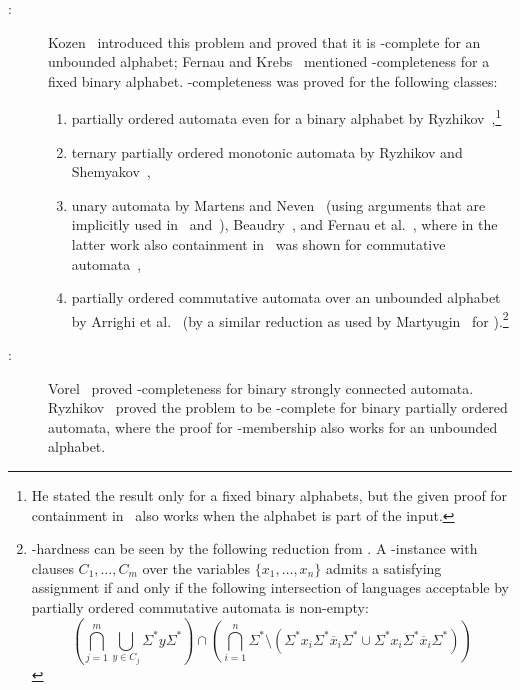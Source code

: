 \begin{description}
	\item[\DFAINT:] \label{prelim:classes:intro:INT}  Kozen~\cite[p.~261]{Kozen77} introduced this problem and proved 
	that it is \PSPACE-complete for an unbounded alphabet;  Fernau and Krebs~\cite[p.~2]{FerKre2017} mentioned \PSPACE-\-com\-plete\-ness for a fixed binary alphabet.		
	\NP-completeness was proved for the following classes: 
	\begin{enumerate}
	\item  partially ordered automata
	even for a binary alphabet by Ryzhikov~\cite[Prop.~9]{Ryzhikov19a},\footnote{He stated the result only for a fixed binary alphabets, but the given proof for containment in \NP\  also works when the alphabet
		is part of the input.}
	
	\item ternary partially ordered monotonic automata by Ryzhikov and Shemyakov~\cite[Thm.~4.1]{RyzhikovS18},
	
	\item unary automata by Martens and Neven~\cite[Lem.~27]{MartensN07} (using arguments that are implicitly
	used in~\cite[Thm.~2]{Galil76} and~\cite[Thm.~6.1]{Stockmeyer73}),
	Beaudry~\cite{Beaudry88thesis}, and Fernau et al.~\cite[Thm.~4.1]{DBLP:journals/corr/abs-2108-05244},
	where in the latter work also containment in \NP\
	was shown for commutative automata~\cite[Thm~4.3]{DBLP:journals/corr/abs-2108-05244},

	\item partially ordered commutative automata
	over an unbounded alphabet by Arrighi et al.~\cite[Lem.~17]{Arrighi2021} 
	(by a similar reduction
	as used by Martyugin~\cite[Prop.~5.3.]{Mar2009b} for \DFASWS).\footnote{\NP-hardness can be seen by the following reduction from \SAT. 
		A \SAT-instance with clauses $C_1, \ldots, C_m$ over the variables $\{ x_1, \ldots, x_n\}$
		admits a satisfying assignment
		if and only if the following intersection of languages acceptable
		by partially ordered commutative automata is non-empty:
		\[
		\left( \bigcap_{j=1}^m \bigcup_{y \in C_j} \Sigma^* y \Sigma^* \right) 
		\cap 
		\left(
		\bigcap_{i=1}^n \Sigma^* \setminus ( \Sigma^* x_i \Sigma^* \overline x_i \Sigma^* \cup \Sigma^* x_i \Sigma^* \overline x_i \Sigma^* )
		\right)
		\]}
	\end{enumerate}
	
	\item[\SFS:] \label{prelim:classes:intro:SFS} Vorel~\cite[Thm.~12]{DBLP:journals/ijfcs/Vorel16} 
	proved \PSPACE-completeness for binary strongly connected automata.
	Ryzhikov~\cite[Thm.~4]{Ryzhikov19a} proved the problem to be \NP-complete
	for binary partially ordered  automata,
	where the proof for \NP-membership  
	also works for an unbounded alphabet.
	

\end{description}
